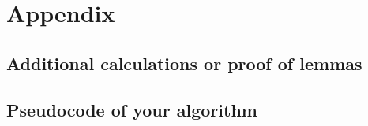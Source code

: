 \documentclass[12pt]{report}
\begin{document}
\chapter*{Appendix}
\renewcommand{\thesection}{\Alph{section}}

\section{Additional calculations or proof of lemmas}

\section{Pseudocode of your algorithm}



\end{document}
